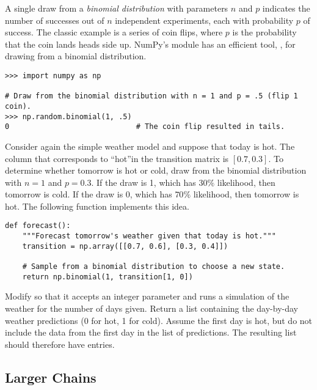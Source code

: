 A single draw from a \emph{binomial distribution} with parameters $n$ and $p$ indicates the number of successes out of $n$ independent experiments, each with probability $p$ of success.
The classic example is a series of coin flips, where $p$ is the probability that the coin lands heads side up.
NumPy's  module has an efficient tool, , for drawing from a binomial distribution.

\begin{lstlisting}
>>> import numpy as np

# Draw from the binomial distribution with n = 1 and p = .5 (flip 1 coin).
>>> np.random.binomial(1, .5)
0                             # The coin flip resulted in tails.
\end{lstlisting}

Consider again the simple weather model and suppose that today is hot.
The column that corresponds to ``hot''in the transition matrix is $[0.7, 0.3]$.
To determine whether tomorrow is hot or cold, draw from the binomial distribution with $n = 1$ and $p = 0.3$.
If the draw is 1, which has $30\%$ likelihood, then tomorrow is cold.
If the draw is 0, which has $70\%$ likelihood, then tomorrow is hot.
The following function implements this idea.

\begin{lstlisting}
def forecast():
    """Forecast tomorrow's weather given that today is hot."""
    transition = np.array([[0.7, 0.6], [0.3, 0.4]])

    # Sample from a binomial distribution to choose a new state.
    return np.binomial(1, transition[1, 0])
\end{lstlisting}

\begin{problem} %
Modify  so that it accepts an integer parameter  and runs a simulation of the weather for the number of days given.
Return a list containing the day-by-day weather predictions (0 for hot, 1 for cold).
Assume the first day is hot, but do not include the data from the first day in the list of predictions.
The resulting list should therefore have  entries.
\label{prob:small-markov-transitions}
\end{problem}

\subsection*{Larger Chains} %

